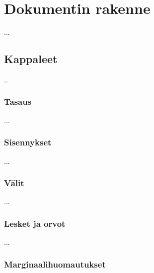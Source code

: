 
\chapter{Dokumentin rakenne}

...

\section{Kappaleet}
\label{luku:kappale}

..

\subsection{Tasaus}

...

\subsection{Sisennykset}

...

\subsection{Välit}


...

\subsection{Lesket ja orvot}


...

\subsection{Marginaalihuomautukset}
\label{luku:marginaalihuomautukset}

